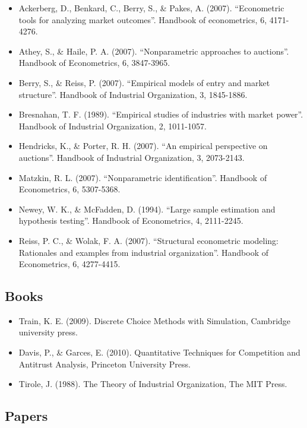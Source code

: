 \documentclass[
]{book}
\providecommand{\tightlist}{%
  \setlength{\itemsep}{0pt}\setlength{\parskip}{0pt}}
\begin{document}
\begin{itemize}
\tightlist
\item
  Ackerberg, D., Benkard, C., Berry, S., \& Pakes, A. (2007). ``Econometric tools for analyzing market outcomes''. Handbook of econometrics, 6, 4171-4276.
\item
  Athey, S., \& Haile, P. A. (2007). ``Nonparametric approaches to auctions''. Handbook of
  Econometrics, 6, 3847-3965.
\item
  Berry, S., \& Reiss, P. (2007). ``Empirical models of entry and market structure''. Handbook of Industrial Organization, 3, 1845-1886.
\item
  Bresnahan, T. F. (1989). ``Empirical studies of industries with market power''. Handbook of
  Industrial Organization, 2, 1011-1057.
\item
  Hendricks, K., \& Porter, R. H. (2007). ``An empirical perspective on auctions''. Handbook of
  Industrial Organization, 3, 2073-2143.
\item
  Matzkin, R. L. (2007). ``Nonparametric identification''. Handbook of Econometrics, 6, 5307-5368.
\item
  Newey, W. K., \& McFadden, D. (1994). ``Large sample estimation and hypothesis testing''. Handbook of Econometrics, 4, 2111-2245.
\item
  Reiss, P. C., \& Wolak, F. A. (2007). ``Structural econometric modeling: Rationales and examples from industrial organization''. Handbook of Econometrics, 6, 4277-4415.
\end{itemize}

\hypertarget{books}{%
\subsection{Books}\label{books}}

\begin{itemize}
\tightlist
\item
  Train, K. E. (2009). Discrete Choice Methods with Simulation, Cambridge university press.
\item
  Davis, P., \& Garces, E. (2010). Quantitative Techniques for Competition and Antitrust Analysis, Princeton University Press.
\item
  Tirole, J. (1988). The Theory of Industrial Organization, The MIT Press.
\end{itemize}

\hypertarget{papers}{%
\subsection{Papers}\label{papers}}
\end{document}
